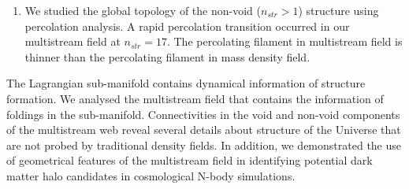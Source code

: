 \documentclass[fleqn,usenatbib,useAMS]{mnras}
\begin{document}
\begin{enumerate}

\item We studied the global topology of the non-void ($n_{str} > 1$) structure using percolation analysis. A rapid percolation transition occurred in our multistream field at $n_{str} = 17$. The percolating filament in multistream field is thinner than the percolating filament in mass density field. 

\end{enumerate}

The Lagrangian sub-manifold contains dynamical information of structure formation. We analysed the multistream field that contains the information of foldings in the sub-manifold.  Connectivities in the void and non-void components of the multistream web reveal several details about structure of the Universe that are not probed by traditional density fields. In addition, we demonstrated the use of geometrical features of the multistream field in identifying potential dark matter halo candidates in cosmological N-body simulations. 
\end{document}
